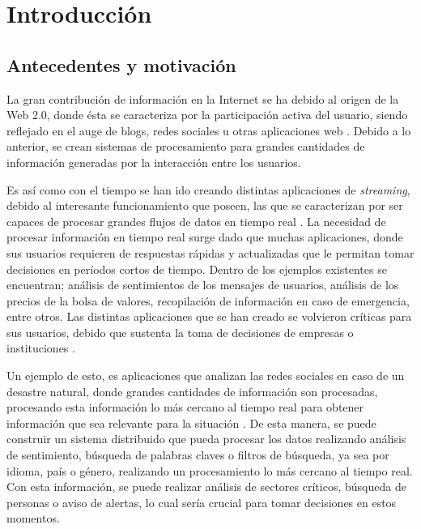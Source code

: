 \chapter{Introducción}
\label{cap:introduccion}

\section{Antecedentes y motivación}
\label{intro:motivacion}

La gran contribución de información en la Internet se ha debido al origen de la Web 2.0, donde ésta se caracteriza por la participación activa del usuario, siendo reflejado en el auge de blogs, redes sociales u otras aplicaciones web \citep{web2007oberhelman}. Debido a lo anterior, se crean sistemas de procesamiento para grandes cantidades de información generadas por la interacción entre los usuarios.

Es así como con el tiempo se han ido creando distintas aplicaciones de \textsl{streaming}, debido al interesante funcionamiento que poseen, las que se caracterizan por ser capaces de procesar grandes flujos de datos en tiempo real \citep{ChenZ14a}. La necesidad de procesar informaci\'on en tiempo real surge dado que muchas aplicaciones, donde sus usuarios requieren de respuestas r\'apidas y actualizadas que le permitan tomar decisiones en per\'iodos cortos de tiempo. Dentro de los ejemplos existentes se encuentran; análisis de sentimientos de los mensajes de usuarios, análisis de los precios de la bolsa de valores, recopilación de información en caso de emergencia, entre otros. Las distintas aplicaciones que se han creado se volvieron críticas para sus usuarios, debido que sustenta la toma de decisiones de empresas o instituciones \citep{Wenzel14}.

Un ejemplo de esto, es aplicaciones que analizan las redes sociales en caso de un desastre natural, donde grandes cantidades de información son procesadas, procesando esta información lo más cercano al tiempo real para obtener información que sea relevante para la situación \citep{andrade2014fundamentals}. De esta manera, se puede construir un sistema distribuido que pueda procesar los datos realizando análisis de sentimiento, búsqueda de palabras claves o filtros de búsqueda, ya sea por idioma, país o género, realizando un procesamiento lo más cercano al tiempo real. Con esta información, se puede realizar análisis de sectores críticos, búsqueda de personas o aviso de alertas, lo cual sería crucial para tomar decisiones en estos momentos.

